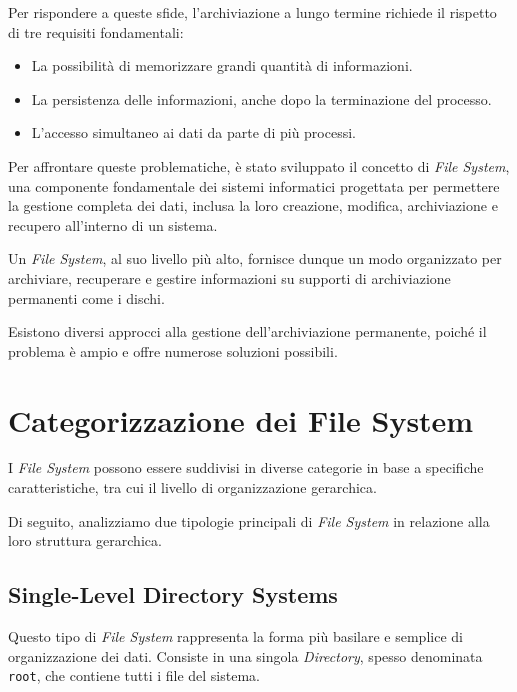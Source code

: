 \documentclass[12pt,a4paper,openright,twoside]{book}
\begin{document}
        Per rispondere a queste sfide, l'archiviazione a lungo termine richiede il rispetto di tre requisiti fondamentali:

        \begin{itemize}
            \item La possibilità di memorizzare grandi quantità di informazioni.
            \item La persistenza delle informazioni, anche dopo la terminazione del processo.
            \item L'accesso simultaneo ai dati da parte di più processi.
        \end{itemize}

        Per affrontare queste problematiche, è stato sviluppato il concetto di \textit{File System}, una componente fondamentale dei sistemi informatici progettata per permettere la gestione completa dei dati, inclusa la loro creazione, modifica, archiviazione e recupero all'interno di un sistema.

        Un \textit{File System}, al suo livello più alto, fornisce dunque un modo organizzato per archiviare, recuperare e gestire informazioni su supporti di archiviazione permanenti come i dischi.

        Esistono diversi approcci alla gestione dell'archiviazione permanente, poiché il problema è ampio e offre numerose soluzioni possibili.

        \cite{giampaolo1998practical}\cite{tanenbaum2015modern}

    \section{Categorizzazione dei File System}

        I \textit{File System} possono essere suddivisi in diverse categorie in base a specifiche caratteristiche, tra cui il livello di organizzazione gerarchica.

        Di seguito, analizziamo due tipologie principali di \textit{File System} in relazione alla loro struttura gerarchica.


        \subsection{Single-Level Directory Systems}

            Questo tipo di \textit{File System} rappresenta la forma più basilare e semplice di organizzazione dei dati. Consiste in una singola \textit{Directory}, spesso denominata \texttt{root}, che contiene tutti i file del sistema.
\end{document}
